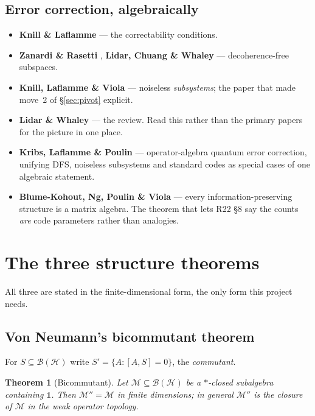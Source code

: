 \documentclass[11pt]{article}
\newcommand{\B}{\mathcal{B}}
\newcommand{\HH}{\mathcal{H}}
\newcommand{\M}{\mathcal{M}}
\theoremstyle{plain}
\newtheorem{theorem}{Theorem}
\theoremstyle{remark}
\begin{document}
\subsection{Error correction, algebraically}

\begin{itemize}
\item \textbf{Knill \& Laflamme} \cite{KL1997} --- the correctability
conditions.
\item \textbf{Zanardi \& Rasetti} \cite{ZR1997}, \textbf{Lidar, Chuang \&
Whaley} \cite{LCW1998} --- decoherence-free subspaces.
\item \textbf{Knill, Laflamme \& Viola} \cite{KLV2000} --- noiseless
\emph{subsystems}; the paper that made move~2 of \S\ref{sec:pivot} explicit.
\item \textbf{Lidar \& Whaley} \cite{LW2003} --- the review. Read this rather
than the primary papers for the picture in one place.
\item \textbf{Kribs, Laflamme \& Poulin} \cite{KLP2005} --- operator-algebra
quantum error correction, unifying DFS, noiseless subsystems and standard codes
as special cases of one algebraic statement.
\item \textbf{Blume-Kohout, Ng, Poulin \& Viola} \cite{BKNPV2008} --- every
information-preserving structure is a matrix algebra. The theorem that lets R22
\S8 say the counts \emph{are} code parameters rather than analogies.
\end{itemize}

\section{The three structure theorems}
\label{sec:theorems}

All three are stated in the finite-dimensional form, the only form this project
needs.

\subsection{Von Neumann's bicommutant theorem}

For $S \subseteq \B(\HH)$ write $S' = \{A : [A,S]=0\}$, the \emph{commutant}.

\begin{theorem}[Bicommutant]
Let $\M \subseteq \B(\HH)$ be a $*$-closed subalgebra containing $\mathbb{1}$.
Then $\M'' = \M$ in finite dimensions; in general $\M''$ is the closure of $\M$
in the weak operator topology.
\end{theorem}
\end{document}

